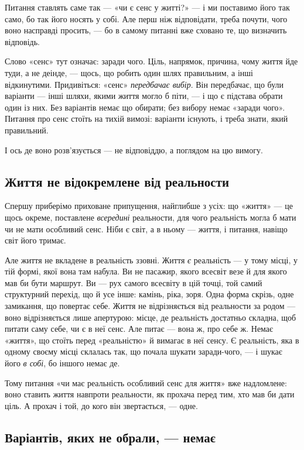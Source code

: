 \documentclass[12pt, a4paper, openany]{book}
\begin{document}
Питання ставлять саме так --- «чи є сенс у житті?» --- і ми поставимо його так само, бо так його носять у собі. Але перш ніж відповідати, треба почути, чого воно насправді просить, --- бо в самому питанні вже сховано те, що визначить відповідь.

Слово «сенс» тут означає: заради чого. Ціль, напрямок, причина, чому життя йде туди, а не деінде, --- щось, що робить один шлях правильним, а інші відкинутими. Придивіться: «сенс» \emph{передбачає вибір}. Він передбачає, що були варіанти --- інші шляхи, якими життя могло б піти, --- і що є підстава обрати один із них. Без варіантів немає що обирати; без вибору немає «заради чого». Питання про сенс стоїть на тихій вимозі: варіанти існують, і треба знати, який правильний.

І ось де воно розв'язується --- не відповіддю, а поглядом на цю вимогу.

\subsection{Життя не відокремлене від реальности}

Спершу приберімо приховане припущення, найглибше з усіх: що «життя» --- це щось окреме, поставлене \emph{всередині} реальности, для чого реальність могла б мати чи не мати особливий сенс. Ніби є світ, а в ньому --- життя, і питання, навіщо світ його тримає.

Але життя не вкладене в реальність ззовні. Життя \emph{є} реальність --- у тому місці, у тій формі, якої вона там набула. Ви не пасажир, якого всесвіт везе й для якого мав би бути маршрут. Ви --- рух самого всесвіту в цій точці, той самий структурний перехід, що й усе інше: камінь, ріка, зоря. Одна форма скрізь, одне замикання, що повертає себе. Життя не відрізняється від реальности за родом --- воно відрізняється лише апертурою: місце, де реальність достатньо складна, щоб питати саму себе, чи є в неї сенс. Але питає --- вона ж, про себе ж. Немає «життя», що стоїть перед «реальністю» й вимагає в неї сенсу. Є реальність, яка в одному своєму місці склалась так, що почала шукати заради-чого, --- і шукає його \emph{в собі}, бо іншого немає де.

Тому питання «чи має реальність особливий сенс для життя» вже надломлене: воно ставить життя навпроти реальности, як прохача перед тим, хто мав би дати ціль. А прохач і той, до кого він звертається, --- одне.

\subsection{Варіантів, яких не обрали, --- немає}
\end{document}

